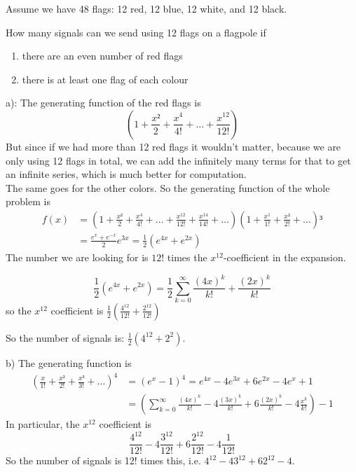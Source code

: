 \documentclass[english]{lbscript}
\begin{document}
\begin{example}{}{}
  Assume we have 48 flags: 12 red, 12 blue, 12 white, and 12 black.

  How many signals can we send using 12 flags on a flagpole if
  \begin{enumerate}[label=(\alph{*})]
    \item\label{item:16} there are an even number of red flags
    \item\label{item:17} there is at least one flag of each colour
  \end{enumerate}

  a): The generating function of the red flags is
  \begin{equation}
    \label{eq:47}
    \left(1+\frac{x²}{2} + \frac{x^{4}}{4!} + \dots + \frac{x^{12}}{12!} \right)
  \end{equation}
  But since if we had more than 12 red flags it wouldn't matter, because we are only using 12 flags in total, we can add the infinitely many terms for that to get an infinite series, which is much better for computation.\\
  The same goes for the other colors. So the generating function of the whole problem is
  \begin{align}
    \label{eq:48}
    f(x)
     & = \left(1+\frac{x²}{2} + \frac{x^{4}}{4!} + \dots + \frac{x^{12}}{12!} + \frac{x^{14}}{14!}+\dots \right) \left(1 + \frac{x^{1}}{1!}+\frac{x²}{2!}+\dots \right)³ \\
     & = \frac{e^{x}+e^{-x}}{2} e^{3x} = \frac{1}{2}\left(e^{4x}+e^{2x} \right)
  \end{align}
  The number we are looking for is \(12!\) times the \(x^{12}\)-coefficient in the expansion.

  \begin{equation}
    \label{eq:49}
    \frac{1}{2}(e^{4x}+e^{2x}) = \frac{1}{2} ∑_{k=0}^{∞} \frac{(4x)^{k}}{k!} + \frac{(2x)^{k}}{k!}
  \end{equation}
  so the \(x^{12}\) coefficient is \(\frac{1}{2}\left( \frac{4^{12}}{12!} + \frac{2^{12}}{12!}\right)\)

  So the number of signals is: \(\frac{1}{2} \left(4^{12}+2^{2} \right) \).

  b) The generating function is
  \begin{align}
    \label{eq:50}
    \left(\frac{x}{1!} + \frac{x²}{2!}+ \frac{x³}{3!} + \dots \right)^{4}
     & = \left(e^{x}-1 \right)^{4} = e^{4x}-4e^{3x}+6e^{2x}-4e^{x}+1                                                            \\
     & = \left(∑_{k=0}^{∞} \frac{(4x)^{k}}{k!} - 4 \frac{(3x)^{k}}{k!} + 6 \frac{(2x)^{k}}{k!} - 4 \frac{x^{k}}{k!} \right) - 1
  \end{align}
  In particular, the \(x^{12}\) coefficient is
  \begin{equation}
    \label{eq:51}
    \frac{4^{12}}{12!} - 4 \frac{3^{12}}{12!} + 6 \frac{2^{12}}{12!} - 4 \frac{1}{12!}
  \end{equation}
  So the number of signals is 12! times this, i.e. \(4^{12}-4 3^{12} + 6 2^{12} - 4\).
\end{example}
\end{document}
